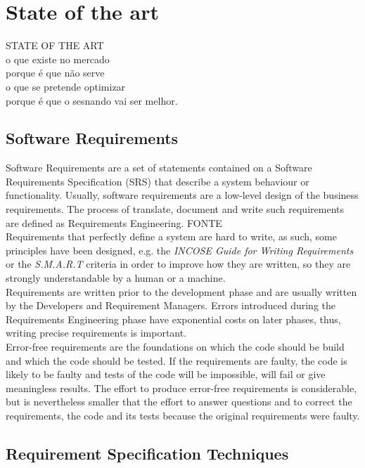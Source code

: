 \label{ch:3}
\chapter{State of the art}

STATE OF THE ART\\
o que existe no mercado\\
porque é que não serve\\
o que se pretende optimizar\\
porque é que o sesnando vai ser melhor.

\section{Software Requirements}
\label{sec:software_requirements}

Software Requirements are a set of statements contained on a Software Requirements Specification (SRS) that describe a system behaviour or functionality. Usually, software requirements are a low-level design of the business requirements. The process of translate, document and write such requirements are defined as Requirements Engineering. FONTE\\
Requirements that perfectly define a system are hard to write, as such, some principles have been designed, e.g. the \textit{INCOSE Guide for Writing Requirements} or the \textit{S.M.A.R.T} criteria in order to improve how they are written, so they are strongly understandable by a human or a machine.\\
Requirements are written prior to the development phase and are usually written by the Developers and Requirement Managers. Errors introduced during the Requirements Engineering phase have exponential costs on later phases, thus, writing precise requirements is important. \\
Error-free requirements are the foundations on which the code should be build and which the code should be tested. If the requirements are faulty, the code is likely to be faulty and tests of the code will be impossible, will fail or give meaningless results. The effort to produce error-free requirements is considerable, but is nevertheless smaller that the effort to answer questions and to correct the requirements, the code and its tests because the original requirements were faulty.


\label{sec:requirement_specification}
\section{Requirement Specification Techniques}

